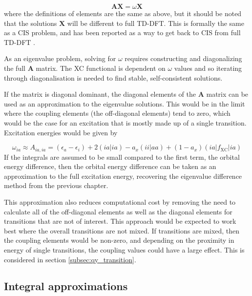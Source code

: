 \begin{equation}
\mathbf{A} \mathbf{X} = \omega \mathbf{X}
\end{equation}
%
where the definitions of elements are the same as above, but it should be noted 
that the solutions $\mathbf{X}$ will be different to full TD-DFT. This is formally
the same as a CIS problem, and has been reported as a way to get back to CIS from 
full TD-DFT \cite{Yoshimine1992, Hirata1999}.

As an eigenvalue problem, solving for $\omega$ requires constructing and diagonalizing
the full $\mathbf{A}$ matrix. The XC functional is dependent on $\omega$ values and so
iterating through diagonalisation is needed to find stable, self-consistent solutions.

If the matrix is diagonal dominant, the diagonal elements of the $\mathbf{A}$ matrix 
can be used as an approximation to the eigenvalue solutions. This would be in the 
limit where the coupling elements (the off-diagonal elements) tend to zero, which
would be the case for an excitation that is mostly made up of a single transition.
Excitation energies would be given by

\begin{equation}
\omega_{ia} \approx A_{ia, ia} = \left( \epsilon_a - \epsilon_i \right) + 2\left(ia|ia\right) - a_x\left(ii|aa\right) + (1- a_x)\left(ia|f_{\text{XC}}|ia\right) 
\label{eq:diag_dom}
\end{equation}
%
If the integrals are assumed to be small compared to the first term, the orbital 
energy difference, then the orbital energy difference can be taken as an approximation 
to the full excitation energy, recovering the eigenvalue difference method from
the previous chapter.

This approximation also reduces computational cost by removing the need to calculate
all of the off-diagonal elements as well as the diagonal elements for transitions
that are not of interest. This approach would be expected to work best where the
overall transitions are not mixed. If transitions are mixed, then the coupling elements
would be non-zero, and depending on the proximity in energy of single transitions,
the coupling values could have a large effect. This is considered in section \ref{subsec:qy_transition}.

\subsection{Integral approximations}
\label{subsec:MNOK}

